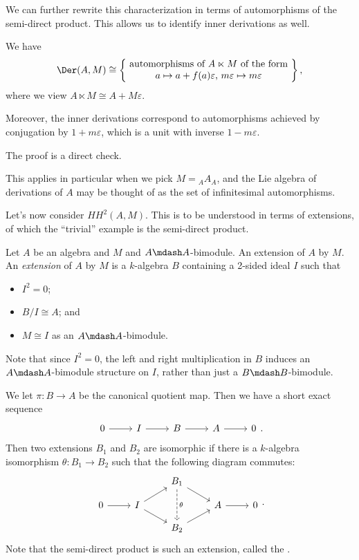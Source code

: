 \documentclass[a4paper]{article}
\newcommand\HH{H\!H}
\begin{document}
We can further rewrite this characterization in terms of automorphisms of the semi-direct product. This allows us to identify inner derivations as well.

\begin{lemma}
  We have
  \[
    \Der(A, M) \cong \left\{\parbox{6cm}{\centering automorphisms of $A \ltimes M$ of the form $a \mapsto a + f(a) \varepsilon$, $m\varepsilon \mapsto m\varepsilon$}\right\},
  \]
  where we view $A \ltimes M \cong A + M \varepsilon$.

  Moreover, the inner derivations correspond to automorphisms achieved by conjugation by $1 + m\varepsilon$, which is a unit with inverse $1 - m \varepsilon$.
\end{lemma}
The proof is a direct check.

This applies in particular when we pick $M = {_AA_A}$, and the Lie algebra of derivations of $A$ may be thought of as the set of infinitesimal automorphisms.

\separator

Let's now consider $\HH^2(A, M)$. This is to be understood in terms of extensions, of which the ``trivial'' example is the semi-direct product.

\begin{defi}[Extension]
  Let $A$ be an algebra and $M$ and $A\mdash A$-bimodule. An extension of $A$ by $M$. An \emph{extension} of $A$ by $M$ is a $k$-algebra $B$ containing a 2-sided ideal $I$ such that
  \begin{itemize}
    \item $I^2 = 0$;
    \item $B/I \cong A$; and
    \item $M \cong I$ as an $A\mdash A$-bimodule.
  \end{itemize}
  Note that since $I^2 = 0$, the left and right multiplication in $B$ induces an $A\mdash A$-bimodule structure on $I$, rather than just a $B\mdash B$-bimodule.
\end{defi}

We let $\pi: B \to A$ be the canonical quotient map. Then we have a short exact sequence
\[
  \begin{tikzcd}
    0 \ar[r] & I \ar[r] & B \ar[r] & A \ar[r] & 0
  \end{tikzcd}.
\]
Then two extensions $B_1$ and $B_2$ are isomorphic if there is a $k$-algebra isomorphism $\theta: B_1 \to B_2$ such that the following diagram commutes:
\[
  \begin{tikzcd}[row sep=small]
    & & B_1 \ar[rd] \ar[dd, dashed, "\theta"]\\
    0 \ar[r] & I \ar[ur] \ar[dr] & & A \ar[r] & 0\\
    & & B_2 \ar[ur]
  \end{tikzcd}.
\]
Note that the semi-direct product is such an extension, called the .
\end{document}
